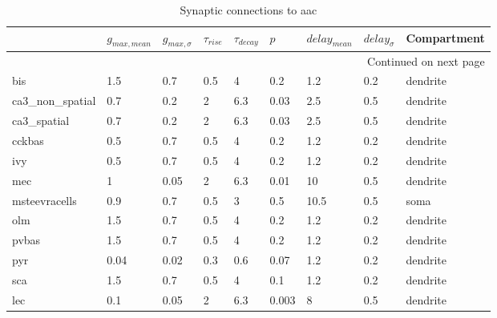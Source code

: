 \begin{longtable}{lllllllll}
\caption{Synaptic connections to aac}\label{aac_synapses}\\
\toprule
{} &  $g_{max, mean}$ & $g_{max, \sigma}$ & $\tau_{rise}$ & $\tau_{decay}$ &   $p$ & $delay_{mean}$ & $delay_{\sigma}$ & Compartment \\
\midrule
\endhead
\midrule
\multicolumn{9}{r}{{Continued on next page}} \\
\midrule
\endfoot

\bottomrule
\endlastfoot
bis             &   1.5 &      0.7 &      0.5 &         4 &    0.2 &   1.2 &       0.2 &      dendrite\ \\
ca3\_non\_spatial &   0.7 &      0.2 &        2 &       6.3 &   0.03 &   2.5 &       0.5 &      dendrite\ \\
ca3\_spatial     &   0.7 &      0.2 &        2 &       6.3 &   0.03 &   2.5 &       0.5 &      dendrite\ \\
cckbas          &   0.5 &      0.7 &      0.5 &         4 &    0.2 &   1.2 &       0.2 &      dendrite\ \\
ivy             &   0.5 &      0.7 &      0.5 &         4 &    0.2 &   1.2 &       0.2 &      dendrite\ \\
mec             &     1 &     0.05 &        2 &       6.3 &   0.01 &    10 &       0.5 &      dendrite\ \\
msteevracells   &   0.9 &      0.7 &      0.5 &         3 &    0.5 &  10.5 &       0.5 &               soma \\
olm             &   1.5 &      0.7 &      0.5 &         4 &    0.2 &   1.2 &       0.2 &      dendrite\ \\
pvbas           &   1.5 &      0.7 &      0.5 &         4 &    0.2 &   1.2 &       0.2 &      dendrite\ \\
pyr             &  0.04 &     0.02 &      0.3 &       0.6 &   0.07 &   1.2 &       0.2 &      dendrite\ \\
sca             &   1.5 &      0.7 &      0.5 &         4 &    0.1 &   1.2 &       0.2 &      dendrite\ \\
lec             &   0.1 &     0.05 &        2 &       6.3 &  0.003 &     8 &       0.5 &      dendrite\ \\
\end{longtable}
